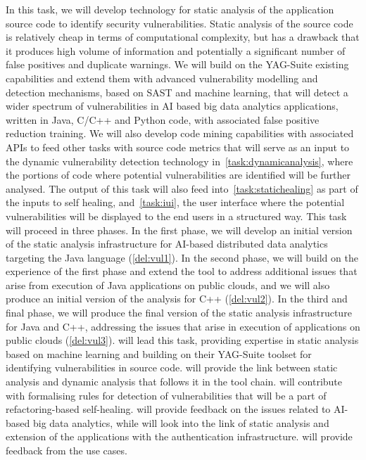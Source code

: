 \begin{Workpackage}{\thewpno}
\begin{Task}
\TaskResults{%
\ref{del:vul1},
\ref{del:vul2},
\ref{del:vul3}
}
\TaskHeader{}
In this task, we will develop technology for static analysis of the application source code to identify security vulnerabilities. Static analysis of the source code is relatively cheap in terms of computational complexity, but has a drawback that it produces high volume of information and potentially a significant number of false positives and duplicate warnings. %
We will build on the YAG-Suite existing capabilities and extend them with advanced vulnerability modelling and detection mechanisms, based on SAST and machine learning, that will detect a wider spectrum of vulnerabilities in AI based big data analytics applications, written in Java, C/C++ and Python code, with associated false positive reduction training. We will also develop code mining capabilities with associated APIs to feed other tasks with source code metrics that will serve as an input to the dynamic vulnerability detection technology in~\ref{task:dynamicanalysis}, where the portions of code where potential vulnerabilities are identified will be further analysed. The output of this task will also feed into~\ref{task:statichealing} as part of the inputs to self healing, and~\ref{task:iui}, the user interface where the potential vulnerabilities will be displayed to the end users in a structured way. This task will proceed in three phases. In the first phase, we will develop an initial version of the static analysis infrastructure for AI-based distributed data analytics targeting the Java language (\ref{del:vul1}). In the second phase, we will build on the experience of the first phase and extend the tool to address additional issues that arise from execution of Java applications on public clouds, and we will also produce an initial version of the analysis for C++ (\ref{del:vul2}). \taskbreak In the third and final phase, we will produce the final version of the static analysis infrastructure for Java and C++, addressing the issues that arise in execution of applications on public clouds (\ref{del:vul3}). \YAGshort{} will lead this task, providing expertise in static analysis based on machine learning and building on their YAG-Suite toolset for identifying vulnerabilities in source code. \IBMshort{} will provide the link between static analysis and dynamic analysis that follows it in the \TheProject{} tool chain. \SAshort{} will contribute with formalising rules for detection of vulnerabilities that will be a part of refactoring-based self-healing. \UODshort{} will provide feedback on the issues related to AI-based big data analytics, while \COGNIshort{} will look into the link of static analysis and extension of the applications with the authentication infrastructure. \SOPRAshort{} will provide feedback from the use cases.



\end{Task}
\end{Workpackage}
